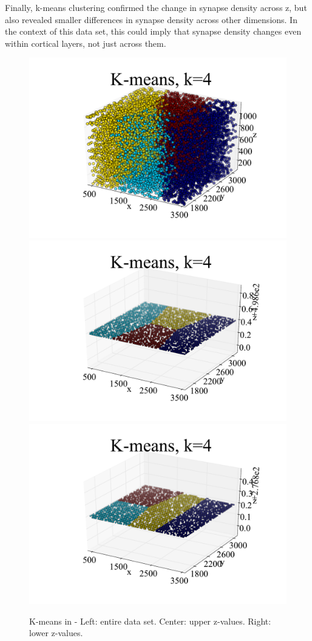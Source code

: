 \documentclass{article}
\begin{document}
Finally, k-means clustering confirmed the change in synapse density across z, but also revealed smaller differences in synapse density across other dimensions. In the context of this data set, this could imply that synapse density changes even within cortical layers, not just across them.

\begin{figure}[h]
  \centering
  \includegraphics[scale=.15]{Fig13a}
  \includegraphics[scale=.15]{Fig13b}
  \includegraphics[scale=.15]{Fig13c}
  \caption{K-means in -  Left: entire data set. Center: upper z-values. Right: lower z-values.}
\end{figure}
\end{document}

